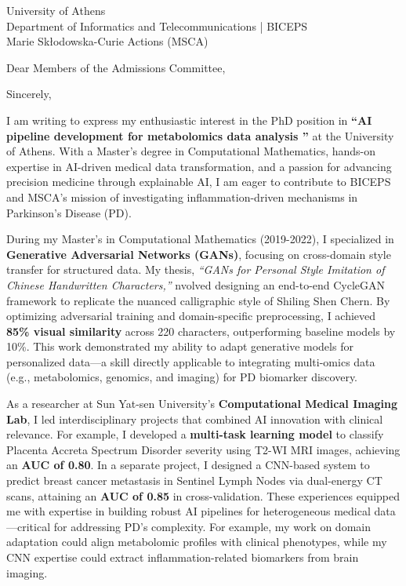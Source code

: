 \documentclass[11pt,a4paper, final]{moderncv}
\begin{document}
{University of Athens\\
Department of Informatics and Telecommunications | BICEPS\\
Marie Skłodowska-Curie Actions (MSCA)
}
\date{\today}
\opening{Dear Members of the Admissions Committee,}
\closing{Sincerely,}
\makelettertitle
\thispagestyle{empty}
\pagestyle{empty}
I am writing to express my enthusiastic interest in the PhD position 
in \textbf{``AI pipeline development for metabolomics data analysis ''} at the University of Athens. 
With a Master's degree in Computational Mathematics, 
hands-on expertise in AI-driven medical data transformation, 
and a passion for advancing precision medicine through explainable AI, 
I am eager to contribute to BICEPS and MSCA's mission of investigating inflammation-driven mechanisms in Parkinson's Disease (PD).

During my Master's in Computational Mathematics (2019-2022), 
I specialized in \textbf{Generative Adversarial Networks (GANs)}, 
focusing on cross-domain style transfer for structured data. 
My thesis, \emph{``GANs for Personal Style Imitation of Chinese Handwritten Characters,''} 
nvolved designing an end-to-end CycleGAN framework to replicate the nuanced calligraphic style of Shiling Shen Chern. 
By optimizing adversarial training and domain-specific preprocessing, 
I achieved \textbf{85\% visual similarity} across 220 characters, outperforming baseline models by 10\%. 
This work demonstrated my ability to adapt generative models for personalized data—a skill directly applicable 
to integrating multi-omics data (e.g., metabolomics, genomics, and imaging) for PD biomarker discovery.

As a researcher at Sun Yat-sen University's \textbf{Computational Medical Imaging Lab}, 
I led interdisciplinary projects that combined AI innovation with clinical relevance. 
For example, I developed a \textbf{multi-task learning model} to 
classify Placenta Accreta Spectrum Disorder severity using T2-WI MRI images, achieving an \textbf{AUC of 0.80}. 
In a separate project, 
I designed a CNN-based system to predict breast cancer metastasis in Sentinel Lymph Nodes via dual-energy CT scans, 
attaining an \textbf{AUC of 0.85} in cross-validation. 
These experiences equipped me with expertise in building robust AI pipelines for heterogeneous medical data—critical for addressing PD's complexity. 
For example, my work on domain adaptation could align metabolomic profiles with clinical phenotypes, while my CNN expertise could extract inflammation-related biomarkers from brain imaging.
\end{document}
